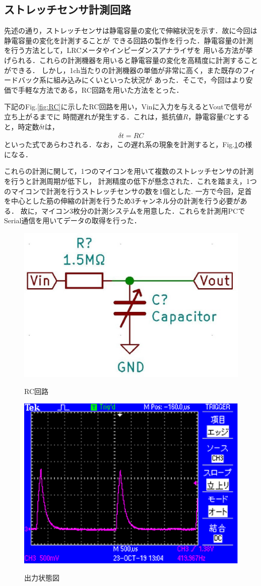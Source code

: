 \subsection{ストレッチセンサ計測回路}\label{sec:RC回路}
先述の通り，ストレッチセンサは静電容量の変化で伸縮状況を示す．故に今回は静電容量の変化を計測することが
できる回路の製作を行った．静電容量の計測を行う方法として，LRCメータやインピーダンスアナライザを
用いる方法が挙げられる．これらの計測機器を用いると静電容量の変化を高精度に計測することができる．
しかし，1ch当たりの計測機器の単価が非常に高く，また既存のフィードバック系に組み込みにくいといった状況が
あった．そこで，今回はより安価で手軽な方法である，RC回路を用いた方法をとった．

下記のFig.\ref{fig:RC}に示したRC回路を用い，Vinに入力を与えるとVoutで信号が立ち上がるまでに
時間遅れが発生する．これは，抵抗値$R$，静電容量$C$とすると，時定数$\delta t$は，
\begin{eqnarray}
    \delta t = RC
\end{eqnarray}
といった式であらわされる．なお，この遅れ系の現象を計測すると，Fig.\ref{fig:oscilloscope}の様になる．

これらの計測に関して，1つのマイコンを用いて複数のストレッチセンサの計測を行うと計測周期が低下し，
計測精度の低下が懸念された．これを踏まえ，1つのマイコンで計測を行うストレッチセンサの数を1個とした.
一方で今回，足首を中心とした筋の伸縮の計測を行うため3チャンネル分の計測を行う必要がある．
故に，マイコン3枚分の計測システムを用意した．これらを計測用PCでSerial通信を用いてデータの取得を行った．
\begin{figure}[h]
    \begin{center}
        \includegraphics[width=0.4\columnwidth,clip]{./2_measurement/RC.eps}
        \caption{RC回路}
        \label{fig:RC}
        \includegraphics[width=0.4\columnwidth,clip]{./2_measurement/oscilloscope.eps}
        \caption{出力状態図}
        \label{fig:oscilloscope}
    \end{center}
\end{figure}

